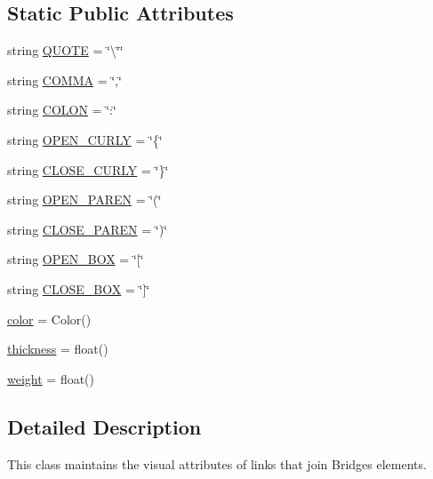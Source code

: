 \subsection*{Static Public Attributes}
\begin{DoxyCompactItemize}
\item 
string \hyperlink{class_link_visualizer_1_1_link_visualizer_a595bb37530287561ffcf304343f7cbde}{Q\+U\+O\+TE} = \char`\"{}\textbackslash{}\char`\"{}\char`\"{}
\item 
string \hyperlink{class_link_visualizer_1_1_link_visualizer_ad224a39d19962af54d0726969daa2de2}{C\+O\+M\+MA} = \char`\"{},\char`\"{}
\item 
string \hyperlink{class_link_visualizer_1_1_link_visualizer_a179dcb192b99a210729db42add346470}{C\+O\+L\+ON} = \char`\"{}\+:\char`\"{}
\item 
string \hyperlink{class_link_visualizer_1_1_link_visualizer_a950cd3c24de95491a53c5cdbd4813a90}{O\+P\+E\+N\+\_\+\+C\+U\+R\+LY} = \char`\"{}\{\char`\"{}
\item 
string \hyperlink{class_link_visualizer_1_1_link_visualizer_a32ff73aa930e9c4a76d26912eb0b6fc9}{C\+L\+O\+S\+E\+\_\+\+C\+U\+R\+LY} = \char`\"{}\}\char`\"{}
\item 
string \hyperlink{class_link_visualizer_1_1_link_visualizer_a0c22a31e997863f6cbdb4507ca5eae4a}{O\+P\+E\+N\+\_\+\+P\+A\+R\+EN} = \char`\"{}(\char`\"{}
\item 
string \hyperlink{class_link_visualizer_1_1_link_visualizer_a87bf59ceee60cb2820d9fa5f87d8accb}{C\+L\+O\+S\+E\+\_\+\+P\+A\+R\+EN} = \char`\"{})\char`\"{}
\item 
string \hyperlink{class_link_visualizer_1_1_link_visualizer_aba39bf04f99a352408ea57a73fccead8}{O\+P\+E\+N\+\_\+\+B\+OX} = \char`\"{}\mbox{[}\char`\"{}
\item 
string \hyperlink{class_link_visualizer_1_1_link_visualizer_a53eecc0f75db3bc4f80fd3043371364f}{C\+L\+O\+S\+E\+\_\+\+B\+OX} = \char`\"{}\mbox{]}\char`\"{}
\item 
\hyperlink{class_link_visualizer_1_1_link_visualizer_a534ed7a306063db52d7b668542f1ebb5}{color} = Color()
\item 
\hyperlink{class_link_visualizer_1_1_link_visualizer_af43b27883cc7b1427ad929b8f9717af9}{thickness} = float()
\item 
\hyperlink{class_link_visualizer_1_1_link_visualizer_ab3663261fc964c75d45b76803384d933}{weight} = float()
\end{DoxyCompactItemize}


\subsection{Detailed Description}
This class maintains the visual attributes of links that join Bridges elements. 

